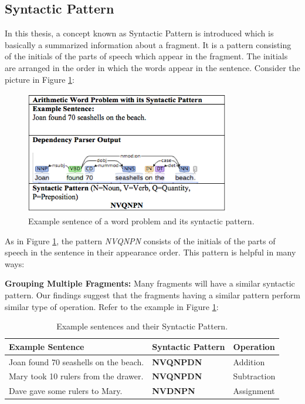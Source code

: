 \documentclass[11pt]{article}
\begin{document}
\subsection{Syntactic Pattern}\label{sec:syntacticpattern}
In this thesis, a concept known as Syntactic Pattern is introduced which is basically a summarized information about a fragment. It is a pattern consisting of the initials of the parts of speech which appear in the fragment. The initials are arranged in the order in which the words appear in the sentence. Consider the picture in Figure \ref{figure:13}:

\begin{figure}[h!]
\includegraphics[width=0.8\textwidth]{Figure1}
\centering
\caption{Example sentence of a word problem and its syntactic pattern.}
\label{figure:13}
\end{figure}

As in Figure \ref{figure:13}, the pattern \textit{NVQNPN} consists of the initials of the parts of speech in the sentence in their appearance order. This pattern is helpful in many ways:

\textbf{Grouping Multiple Fragments:} Many fragments will have a similar syntactic pattern. Our findings suggest that the fragments having a similar pattern perform similar type of operation. Refer to the example in Figure \ref{figure:14}:

\begin{table}[h!]
\centering
\begin{tabular}{ | m{16em} | m{6em} | m{6em} |}
\hline
\textbf{Example Sentence} & \textbf{Syntactic Pattern} & \textbf{Operation}\\
\hline
Joan found 70 seashells on the beach. & \textbf{NVQNPDN} & Addition \\
\hline
Mary took 10 rulers from the drawer. & \textbf{NVQNPDN} & Subtraction\\
\hline
Dave gave some rulers to Mary. & \textbf{NVDNPN} & Assignment\\
\hline
\end{tabular}
\caption{Example sentences and their Syntactic Pattern.}
\label{figure:14}
\end{table}
 
\end{document}
